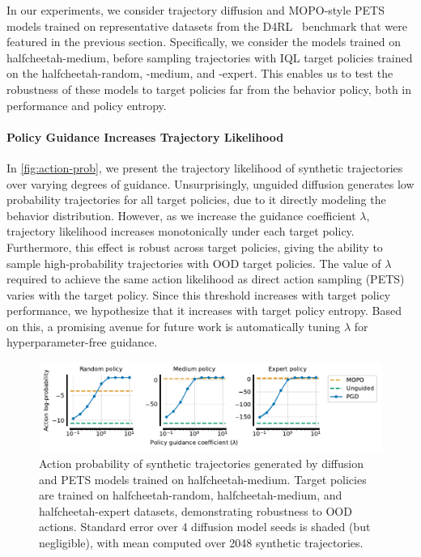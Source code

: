 \documentclass[10pt]{article} %
\theoremstyle{plain}
\theoremstyle{definition}
\theoremstyle{remark}
\begin{document}
In our experiments, we consider trajectory diffusion and MOPO-style PETS~\citep{chua2018deep} models trained on representative datasets from the D4RL~\citep{fu2020d4rl} benchmark that were featured in the previous section.
Specifically, we consider the models trained on halfcheetah-medium, before sampling trajectories with IQL target policies trained on the halfcheetah-random, -medium, and -expert.
This enables us to test the robustness of these models to target policies far from the behavior policy, both in performance and policy entropy.

\paragraph{Policy Guidance Increases Trajectory Likelihood} 
In \autoref{fig:action-prob}, we present the trajectory likelihood of synthetic trajectories over varying degrees of guidance.
Unsurprisingly, unguided diffusion generates low probability trajectories for all target policies, due to it directly modeling the behavior distribution.
However, as we increase the guidance coefficient $\lambda$, trajectory likelihood increases monotonically under each target policy.
Furthermore, this effect is robust across target policies, giving the ability to sample high-probability trajectories with OOD target policies.
The value of $\lambda$ required to achieve the same action likelihood as direct action sampling (PETS) varies with the target policy.
Since this threshold increases with target policy performance, we hypothesize that it increases with target policy entropy.
Based on this, a promising avenue for future work is automatically tuning $\lambda$ for hyperparameter-free guidance.


\begin{figure}[ht]
    \centering
    \includegraphics[width=\linewidth]{figs/action_prob.pdf}
    \caption{Action probability of synthetic trajectories generated by diffusion and PETS models trained on halfcheetah-medium. Target policies are trained on halfcheetah-random, halfcheetah-medium, and halfcheetah-expert datasets, demonstrating robustness to OOD actions. Standard error over 4 diffusion model seeds is shaded (but negligible), with mean computed over 2048 synthetic trajectories.}
    \label{fig:action-prob}
\end{figure}
\end{document}
